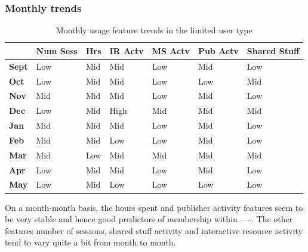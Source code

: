 \documentclass{acm_proc_article-sp}
\begin{document}
\subsubsection{Monthly trends}
\begin{table}
\caption{Monthly usage feature trends in the limited user type}
\begin{tabular}{|p{1.5cm}|p{0.6cm}|p{0.6cm}|p{0.6cm}|p{0.6cm}|p{0.8cm}|p{0.8cm}|}
 & Num Sess & Hrs & IR Actv & MS Actv & Pub Actv & Shared Stuff \\ \hline
\textbf{Sept} & Low                                    & Mid   & Mid         & Low             & Mid            & Low                 \\  \hline
\textbf{Oct}   & Low                                    & Mid   & Mid         & Low             & Low            & Mid                 \\  \hline
\textbf{Nov}  & Mid                                    & Mid   & Mid         & Low             & Mid            & Low                 \\  \hline
\textbf{Dec}  & Low                                    & Mid   & High        & Mid             & Mid            & Mid                 \\  \hline
\textbf{Jan}   & Mid                                    & Mid   & Mid         & Low             & Mid            & Low                 \\ \hline
\textbf{Feb}  & Mid                                    & Mid   & Low         & Low             & Mid            & Low                 \\  \hline
\textbf{Mar}     & Mid                                    & Low   & Mid         & Mid             & Mid            & Mid                 \\ \hline
\textbf{Apr}     & Low                                    & Mid   & Mid         & Low             & Mid            & Low                 \\ \hline
\textbf{May}       & Low                                    & Mid   & Low         & Low             & Low            &   Low                 
\end{tabular}
\end{table}
On a month-month basis, the hours spent and publisher activity features seem to be very stable and hence good predictors of membership within ----. The other features number of sessions, shared stuff activity and  interactive resource activity tend to vary quite a bit from month to month.
\end{document}
